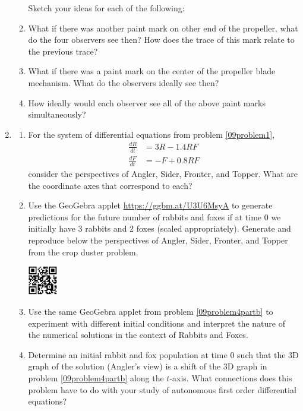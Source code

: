 \begin{enumerate}[resume]
\begin{enumerate}
\vfill
Sketch your ideas for each of the following:
\medskip

\item	What if there was another paint mark on other end of the propeller, what do the four observers see then? How does the trace of this mark relate to the previous trace?\label{09problem3partb}\vfill
\item	What if there was a paint mark on the center of the propeller blade mechanism. What do the observers ideally see then?\label{09problem3partc}\vfill
\item	How ideally would each observer see all of the above paint marks simultaneously?\label{09problem3partd}
\vfill
\end{enumerate}

\clearpage

\item	\label{09problem4}
\begin{enumerate}
\item For the system of differential equations from problem \ref{09problem1},   
\begin{align*}
\frac{dR}{dt} &= 3R-1.4RF \\
\frac{dF}{dt} &= -F+0.8RF
\end{align*}
consider the perspectives of Angler, Sider, Fronter, and Topper. What are the coordinate axes that correspond to each? \label{09problem4parta} \vfill
\item Use the GeoGebra applet \href{https://ggbm.at/U3U6MsyA}{\underline{https://ggbm.at/U3U6MsyA}} to generate predictions for the future number of rabbits and foxes if at time 0 we initially have 3 rabbits and 2 foxes (scaled appropriately). Generate and reproduce below the perspectives of Angler, Sider, Fronter, and Topper from the crop duster problem. \label{09problem4partb} \vfill

\vspace{-1.9in}\hspace{-0.75in}\includegraphics[width=0.5in]{09/09DEExplorerQR.png}
\vfill
\item Use the same GeoGebra applet from problem \ref{09problem4partb} to experiment with different initial conditions and interpret the nature of the numerical solutions in the context of Rabbits and Foxes. \label{09problem4partc} \vfill
\item	Determine an initial rabbit and fox population at time 0 such that the 3D graph of the solution (Angler's view) is a shift of the 3D graph in problem \ref{09problem4partb} along the $t$-axis. What connections does this problem have to do with your study of autonomous first order differential equations? \label{09problem4partd} \vfill
\end{enumerate}


\end{enumerate}
